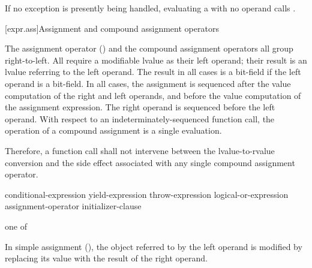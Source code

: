 \pnum
{}%
%
%
If no exception is presently being handled,
evaluating a
with no operand calls
.

[expr.ass]{Assignment and compound assignment operators}%

\pnum
{}%
%
%
%
%
%
%
%
%
%
%
%
The assignment operator (\tcode{=}) and the compound assignment
operators all group right-to-left.
%
All
require a modifiable lvalue as their left operand; their result is an lvalue
referring to the left operand. The result in all cases is a bit-field if
the left operand is a bit-field. In all cases, the assignment is
sequenced after the
%
value computation of the right and left operands,
and before the
value computation of the assignment expression.
The right operand is sequenced before the left operand.
With
respect to an indeterminately-sequenced function call, the operation of
a compound assignment is a single evaluation.
\begin{note}
Therefore, a function call shall not intervene between the
lvalue-to-rvalue conversion and the side effect associated with any
single compound assignment operator.
\end{note}

\begin{bnf}
\br
    conditional-expression\br
    yield-expression\br
    throw-expression\br
    logical-or-expression assignment-operator initializer-clause
\end{bnf}

\begin{bnf}
 \textnormal{one of}\br
    \terminal{=  *=  /=  \%=   +=  -=  >>=  <<=  \&=  \caret=  |=}
\end{bnf}

\pnum
In simple assignment (\tcode{=}), the object referred to by the left operand
is modified by replacing its value with the result of the right operand.

